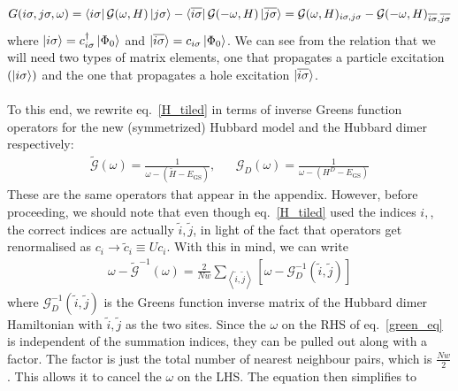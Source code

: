 \documentclass[12pt]{article}
\numberwithin{equation}{section}
\begin{document}
\begin{equation}\begin{aligned}
	G(i\sigma, j\sigma, \omega) = \bra{ i\sigma} \mathcal{G}(\omega, H) \ket{ j\sigma} - \bra{\overline{i\sigma}} \mathcal{G}(-\omega, H) \ket{\overline {j\sigma}} = \mathcal{G}(\omega, H)_{ i\sigma, j\sigma} - \mathcal{G}(-\omega, H)_{\overline{i\sigma}, \overline {j\sigma}}
\end{aligned}\end{equation}
where $\ket{i\sigma}=c^\dagger_{i\sigma}\ket{\Phi_0}$ and $\ket{\overline{i\sigma}}=c_{i\sigma}\ket{\Phi_0}$. We can see from the relation that we will need two types of matrix elements, one that propagates a particle excitation $\left( \ket{i\sigma} \right) $ and the one that propagates a hole excitation $\ket{\overline{i\sigma}}$.
\\\\
To this end, we rewrite eq.~\ref{H_tiled} in terms of inverse Greens function operators for the new (symmetrized) Hubbard model and the Hubbard dimer respectively:
\begin{equation}\begin{aligned}
	\label{Gd_op}
	\mathcal{\tilde G}(\omega) = \frac{1}{\omega - \left(\tilde H - E_\text{GS}\right)}, && \mathcal{G}_D(\omega) = \frac{1}{\omega - \left(H^D - E_\text{GS}\right)}
\end{aligned}\end{equation}
These are the same operators that appear in the appendix. However, before proceeding, we should note that even though eq.~\ref{H_tiled} used the indices $i,$, the correct indices are actually $\tilde i, \tilde j$, in light of the fact that operators get renormalised as $c_i \to \tilde c_i\equiv Uc_i$. With this in mind, we can write
\begin{equation}\begin{aligned}
	\label{green_eq}
	\omega - \mathcal{\tilde G}^{-1}(\omega) = \frac{2}{Nw}\sum_{\left<\tilde i, \tilde j\right>}\left[\omega - \mathcal{G}_D^{-1}\left(\tilde i, \tilde j\right)\right]
\end{aligned}\end{equation}
where $\mathcal{G}_D^{-1}(\tilde i,\tilde j)$ is the Greens function inverse matrix of the Hubbard dimer Hamiltonian with $\tilde i, \tilde j$ as the two sites. Since the $\omega$ on the RHS of eq.~\ref{green_eq} is independent of the summation indices, they can be pulled out along with a factor. The factor is just the total number of nearest neighbour pairs, which is $\frac{Nw}{2}$. This allows it to cancel the $\omega$ on the LHS. The equation then simplifies to
\end{document}
